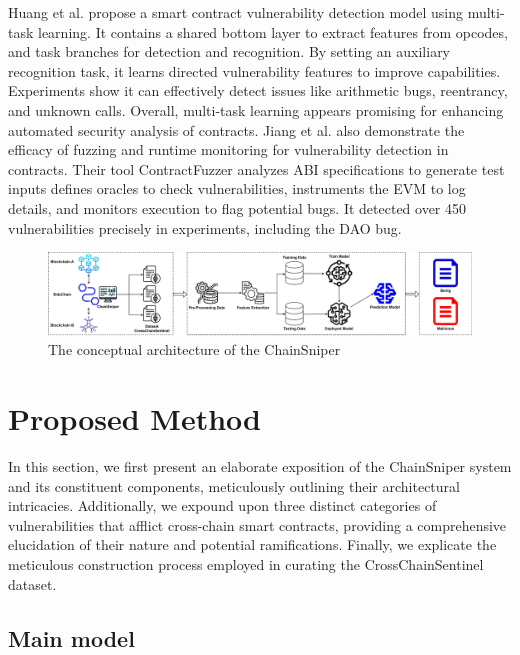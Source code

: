 \documentclass[sigconf]{acmart}
\begin{document}
Huang et al. \cite{huang2022smart} propose a smart contract vulnerability detection model using multi-task learning. It contains a shared bottom layer to extract features from opcodes, and task branches for detection and recognition. By setting an auxiliary recognition task, it learns directed vulnerability features to improve capabilities. Experiments show it can effectively detect issues like arithmetic bugs, reentrancy, and unknown calls. Overall, multi-task learning appears promising for enhancing automated security analysis of contracts. Jiang et al.  \cite{jiang2018contractfuzzer} also demonstrate the efficacy of fuzzing and runtime monitoring for vulnerability detection in contracts. Their tool ContractFuzzer analyzes ABI specifications to generate test inputs defines oracles to check vulnerabilities, instruments the EVM to log details, and monitors execution to flag potential bugs. It detected over 450 vulnerabilities precisely in experiments, including the DAO bug.

\begin{figure}[h]
  \caption{The conceptual architecture of the ChainSniper}
  \label{newModel}
  \centering
  \includegraphics[width=\textwidth]{NewModel.png}
\end{figure}

\vspace{3em}
\section{Proposed Method}
In this section, we first present an elaborate exposition of the ChainSniper system and its constituent components, meticulously outlining their architectural intricacies. Additionally, we expound upon three distinct categories of vulnerabilities that afflict cross-chain smart contracts, providing a comprehensive elucidation of their nature and potential ramifications. Finally, we explicate the meticulous construction process employed in curating the CrossChainSentinel dataset.

\subsection{Main model}
\end{document}
